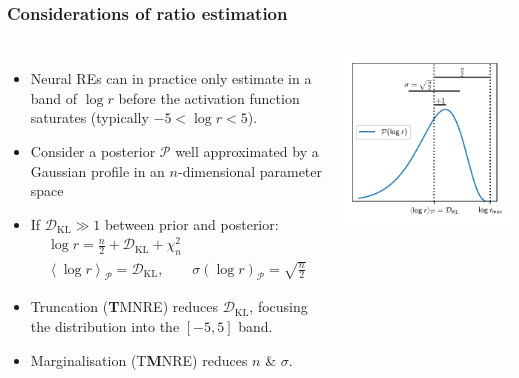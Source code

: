 \documentclass[aspectratio=169]{beamer}
\begin{document}
\appendix

\begin{frame}
    \frametitle{Considerations of ratio estimation}
    \begin{columns}
        \begin{itemize}
            \item Neural REs can in practice only estimate in a band of $\log r$ before the activation function saturates (typically $-5 < \log r < 5$).
            \item Consider a posterior $\mathcal{P}$ well approximated by a Gaussian profile in an $n$-dimensional parameter space~
            \item If $\mathcal{D}_\mathrm{KL}\gg1$ between prior and posterior:
                \begin{gather*}
                    \log r = \frac{n}{2} + \mathcal{D}_\mathrm{KL} + \chi^2_{n} \\
                    \left\langle \log r \right\rangle_\mathcal{P} = \mathcal{D}_\mathrm{KL}, \qquad \sigma(\log r)_\mathcal{P} = \sqrt{\frac{n}{2}}
                \end{gather*}
            \item Truncation ({\bf T}MNRE) reduces $\mathcal{D}_\mathrm{KL}$, focusing the distribution into the $[-5,5]$ band.
            \item Marginalisation (T{\bf M}NRE) reduces $n$ \& $\sigma$.
        \end{itemize}

        \vspace{10pt}
        \includegraphics{figures/anatomy}


\end{columns}
\end{frame}
\end{document}

